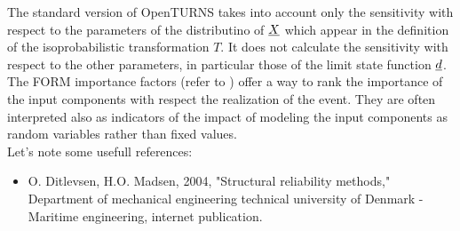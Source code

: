             {
              The standard version of OpenTURNS takes into account only the sensitivity with respect to the parameters of the distributino of ${\underline{X}}$ which appear in the definition of the isoprobabilistic transformation $T$. It does not calculate the sensitivity with respect to the other parameters, in particular those of the limit state function ${\underline{d}}$. \\

              The FORM importance factors (refer to ) offer a way to rank the importance of the input components with respect the realization of the event. They are often interpreted also as indicators of the impact of modeling the input components as random variables rather than fixed values.\\

              Let's note some usefull references:
              \begin{itemize}
              \item O. Ditlevsen, H.O. Madsen, 2004, "Structural reliability methods," Department of mechanical engineering technical university of Denmark - Maritime engineering, internet publication.
              \end{itemize}

            }

